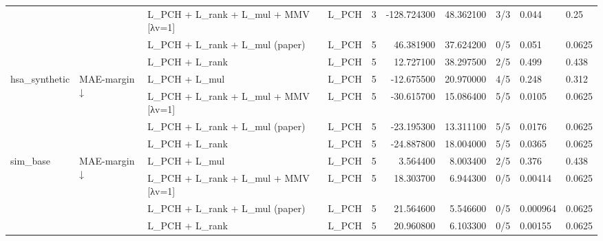 \begin{tabular}{llllrrrlll}
 &  & L\_PCH + L\_rank + L\_mul + MMV [λv=1] & L\_PCH & 3 & -128.724300 & 48.362100 & 3/3 & 0.044 & 0.25 \\
 &  & L\_PCH + L\_rank + L\_mul (paper) & L\_PCH & 5 & 46.381900 & 37.624200 & 0/5 & 0.051 & 0.0625 \\
 &  & L\_PCH + L\_rank & L\_PCH & 5 & 12.727100 & 38.297500 & 2/5 & 0.499 & 0.438 \\
\cline{1-10} \cline{2-10}
\multirow[t]{4}{*}{hsa\_synthetic} & \multirow[t]{4}{*}{MAE-margin ↓} & L\_PCH + L\_mul & L\_PCH & 5 & -12.675500 & 20.970000 & 4/5 & 0.248 & 0.312 \\
 &  & L\_PCH + L\_rank + L\_mul + MMV [λv=1] & L\_PCH & 5 & -30.615700 & 15.086400 & 5/5 & 0.0105 & 0.0625 \\
 &  & L\_PCH + L\_rank + L\_mul (paper) & L\_PCH & 5 & -23.195300 & 13.311100 & 5/5 & 0.0176 & 0.0625 \\
 &  & L\_PCH + L\_rank & L\_PCH & 5 & -24.887800 & 18.004000 & 5/5 & 0.0365 & 0.0625 \\
\cline{1-10} \cline{2-10}
\multirow[t]{4}{*}{sim\_base} & \multirow[t]{4}{*}{MAE-margin ↓} & L\_PCH + L\_mul & L\_PCH & 5 & 3.564400 & 8.003400 & 2/5 & 0.376 & 0.438 \\
 &  & L\_PCH + L\_rank + L\_mul + MMV [λv=1] & L\_PCH & 5 & 18.303700 & 6.944300 & 0/5 & 0.00414 & 0.0625 \\
 &  & L\_PCH + L\_rank + L\_mul (paper) & L\_PCH & 5 & 21.564600 & 5.546600 & 0/5 & 0.000964 & 0.0625 \\
 &  & L\_PCH + L\_rank & L\_PCH & 5 & 20.960800 & 6.103300 & 0/5 & 0.00155 & 0.0625 \\
\cline{1-10} \cline{2-10}
\bottomrule
\end{tabular}
